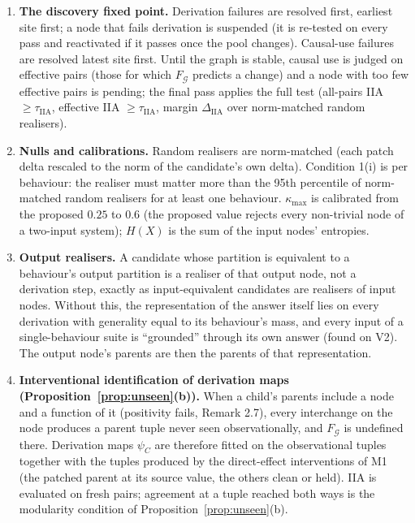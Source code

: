 \documentclass[11pt]{article}
\theoremstyle{definition}
\theoremstyle{plain}
\theoremstyle{remark}
\newcommand{\Hent}{H}
\newcommand{\G}{\mathcal{G}}
\newcommand{\IIA}{\mathrm{IIA}}
\begin{document}
\begin{enumerate}[label=(M\arabic*)]
realiser is proposed only if its value map decodes its label with 2-fold
held-out accuracy $\ge0.9$ (proposal confers nothing; the filter only saves
interventions).
(ii) A candidate whose realiser lies inside a larger candidate (or input
realiser) at the same site whose partition refines it is a
\emph{coarsening} and is not a separate node. (iii) A candidate covered by the
span of two or more smaller, pairwise \emph{separable} (state-level modular)
quotient-passing candidates is a \emph{composite} and is not a node.
(iv) Equivalent candidates are merged; interventions use the realiser at the
node's earliest surviving site with the lowest quotient defect; members at
other sites are bookkeeping.
\item \textbf{The discovery fixed point.} Derivation failures are resolved
first, earliest site first; a node that fails derivation is suspended (it is
re-tested on every pass and reactivated if it passes once the pool changes).
Causal-use failures are resolved latest site first. Until the graph is
stable, causal use is judged on effective pairs (those for which $F_{\G}$
predicts a change) and a node with too few effective pairs is pending; the
final pass applies the full test (all-pairs IIA $\ge\tau_{\IIA}$, effective
IIA $\ge\tau_{\IIA}$, margin $\Delta_{\IIA}$ over norm-matched random realisers).
\item \textbf{Nulls and calibrations.} Random realisers are norm-matched
(each patch delta rescaled to the norm of the candidate's own delta).
Condition 1(i) is per behaviour: the realiser must matter more than the 95th
percentile of norm-matched random realisers for at least one behaviour.
$\kappa_{\max}$ is calibrated from the proposed $0.25$ to $0.6$ (the proposed
value rejects every non-trivial node of a two-input system); $\Hent(X)$ is
the sum of the input nodes' entropies.
\item \textbf{Output realisers.} A candidate whose partition is equivalent to a
behaviour's output partition is a realiser of that output node, not a
derivation step, exactly as input-equivalent candidates are realisers of
input nodes. Without this, the representation of the answer itself lies on
every derivation with generality equal to its behaviour's mass, and every
input of a single-behaviour suite is ``grounded'' through its own answer
(found on V2). The output node's parents are then the parents of that
representation.
\item \textbf{Interventional identification of derivation maps
(Proposition~\ref{prop:unseen}(b)).} When a child's parents include a node
and a function of it (positivity fails, Remark 2.7), every interchange on the
node produces a parent tuple never seen observationally, and $F_{\G}$ is
undefined there. Derivation maps $\psi_C$ are therefore fitted on the
observational tuples together with the tuples produced by the direct-effect
interventions of M1 (the patched parent at its source value, the others
clean or held). IIA is evaluated on fresh pairs; agreement at a tuple reached
both ways is the modularity condition of Proposition~\ref{prop:unseen}(b).
\end{enumerate}
\end{document}
